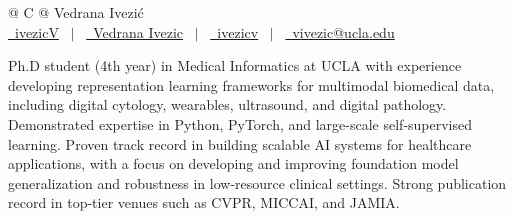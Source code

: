 \documentclass[a4paper,12pt]{article}
\begin{document}
\pagestyle{empty} 



\begin{tabularx}{\linewidth}{@{} C @{}}
\Huge{Vedrana Ivezić} \\[7.5pt]
\href{https://github.com/ivezicV}{\raisebox{-0.05\height}\faGithub\ ivezicV} \ $|$ \ 
\href{https://linkedin.com/in/vedrana-ivezic-180021174/}{\raisebox{-0.05\height}\faLinkedin\ Vedrana Ivezic} \ $|$ \ 
\href{https://ivezicv.github.io/}{\raisebox{-0.05\height}\faGlobe \ ivezicv} \ $|$ \ 
\href{mailto:vivezic@ucla.edu}{\raisebox{-0.05\height}\faEnvelope \ vivezic@ucla.edu} \ 
\end{tabularx}







Ph.D student (4th year) in Medical Informatics at UCLA with experience developing representation learning frameworks for multimodal biomedical data, including digital cytology, wearables, ultrasound, and digital pathology. Demonstrated expertise in Python, PyTorch, and large-scale self-supervised learning. Proven track record in building scalable AI systems for healthcare applications, with a focus on developing and improving foundation model generalization and robustness in low-resource clinical settings. Strong publication record in top-tier venues such as CVPR, MICCAI, and JAMIA.
\end{document}
